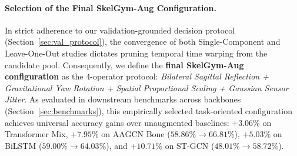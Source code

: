 \documentclass[runningheads]{llncs}
\begin{document}
\paragraph{Selection of the Final SkelGym-Aug Configuration.}
In strict adherence to our validation-grounded decision protocol (Section~\ref{sec:val_protocol}), the convergence of both Single-Component and Leave-One-Out studies dictates pruning temporal time warping from the candidate pool. Consequently, we define the \textbf{final SkelGym-Aug configuration} as the 4-operator protocol: \textit{Bilateral Sagittal Reflection + Gravitational Yaw Rotation + Spatial Proportional Scaling + Gaussian Sensor Jitter}. As evaluated in downstream benchmarks across backbones (Section~\ref{sec:benchmarks}), this empirically selected task-oriented configuration achieves universal accuracy gains over unaugmented baselines: $+3.06\%$ on Transformer Mix, $+7.95\%$ on AAGCN Bone ($58.86\% \to 66.81\%$), $+5.03\%$ on BiLSTM ($59.00\% \to 64.03\%$), and $+10.71\%$ on ST-GCN ($48.01\% \to 58.72\%$).
\end{document}
